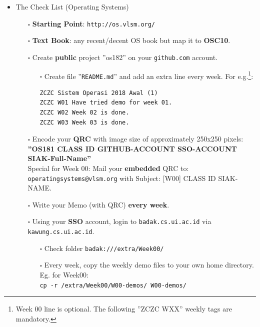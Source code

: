 \documentclass[xcolor=table, notheorems, hyperref={pdfpagelabels=false}]{beamer}
\begin{document}
\begin{frame}[fragile]
\begin{itemize}
\item{The Check List (Operating Systems)}
\begin{itemize}
\item[$\square$] \textbf{Starting Point}: \texttt{http://os.vlsm.org/}
\item[$\square$] \textbf{Text Book}: any recent/decent OS book but map it to \textbf{OSC10}.
\item[$\square$] Create \textbf{public} project ''os182'' on your \texttt{github.com} account.
\begin{itemize}
\item[$\square$] Create file ''\texttt{README.md}'' and add an extra line every week. For e.g.\footnote{%
Week 00 line is optional. The following ''ZCZC WXX'' weekly tags are mandatory.}:
\begin{verbatim}
ZCZC Sistem Operasi 2018 Awal (1)
ZCZC W01 Have tried demo for week 01.
ZCZC W02 Week 02 is done.
ZCZC W03 Week 03 is done.
\end{verbatim}
\end{itemize}
\item[$\square$] Encode your \textbf{QRC} with image size of approximately 250x250 pixels:\\
                 {\scriptsize \textbf{''OS181 CLASS ID GITHUB-ACCOUNT SSO-ACCOUNT SIAK-Full-Name''}}\\
                 Special for Week 00: 
                 Mail your \textbf{embedded} QRC to: \texttt{operatingsystems@vlsm.org} with Subject: [W00] CLASS ID SIAK-NAME.
\item[$\square$] Write your Memo (with QRC) \textbf{every week}.
\item[$\square$] Using your \textbf{SSO} account, login to \texttt{badak.cs.ui.ac.id} via \texttt{kawung.cs.ui.ac.id}.
\begin{itemize}
\item[$\square$] Check folder \texttt{badak:///extra/Week00/}
\item[$\square$] Every week, copy the weekly demo files to your own home directory. Eg. for Week00:\\
                 \texttt{cp -r /extra/Week00/W00-demos/ W00-demos/}
\end{itemize}
\end{itemize}
\end{itemize}
\end{frame}
\end{document}
